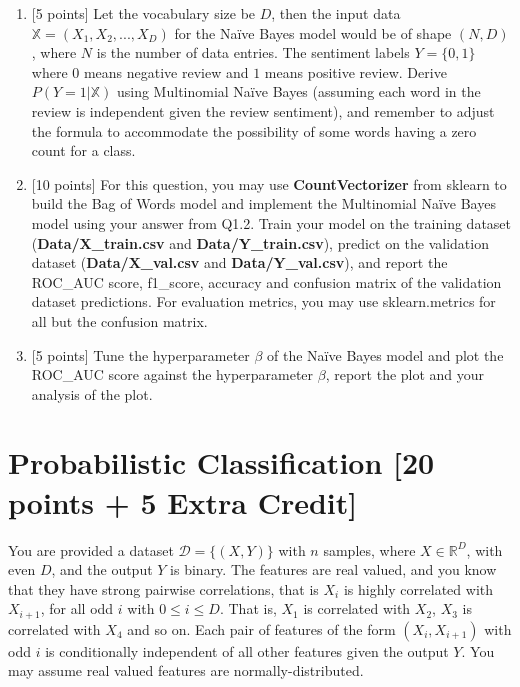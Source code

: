 \documentclass[letterpaper]{article}
\begin{document}
\begin{enumerate}
\item {[5 points]} Let the vocabulary size be $D$, then the input data $\mathbb{X}=(X_1, X_2, ..., X_D)$ for the Na\"ive Bayes model would be of shape $(N, D)$, where $N$ is the number of data entries. The sentiment labels $Y = \{0, 1\}$ where $0$ means negative review and $1$ means positive review. Derive $P(Y=1|\mathbb{X})$ using Multinomial Na\"ive Bayes (assuming each word in the review is independent given the review sentiment), and remember to adjust the formula to accommodate the possibility of some words having a zero count for a class.\\

\item {[10 points]} For this question, you may use \textbf{CountVectorizer} from sklearn to build the Bag of Words model and implement the Multinomial Na\"ive Bayes model using your answer from Q1.2. Train your model on the training dataset (\textbf{Data/X\_train.csv} and \textbf{Data/Y\_train.csv}), predict on the validation dataset (\textbf{Data/X\_val.csv} and \textbf{Data/Y\_val.csv}), and report the ROC\_AUC score, f1\_score, accuracy and confusion matrix of the validation dataset predictions. For evaluation metrics, you may use sklearn.metrics for all but the confusion matrix.\\

\item {[5 points]} Tune the hyperparameter $\beta$ of the Na\"ive Bayes model and plot the ROC\_AUC score against the hyperparameter $\beta$, report the plot and your analysis of the plot.
\end{enumerate}




\section{Probabilistic Classification [20 points + 5 Extra Credit]}
You are provided a dataset $\mathcal{D} = \{(X,Y) \}$ with $n$ samples, where $X\in\mathbb{R}^D$, with even $D$, and the output $Y$ is binary. The features are real valued, and you know that they have strong pairwise correlations, that is $X_i$ is highly correlated with $X_{i+1}$, for all odd $i$ with $0 \leq i\leq D$. That is, $X_1$ is correlated with $X_2$, $X_3$ is correlated with $X_4$ and so on. Each pair of features of the form $(X_i, X_{i+1})$ with odd $i$ is conditionally independent of all other features given the output $Y$. You may assume real valued features are normally-distributed.
\end{document}
